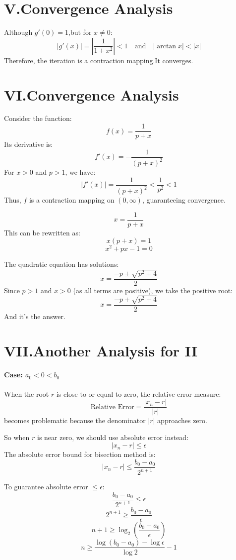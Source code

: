 \documentclass[a4paper]{article}
\begin{document}
\section*{V.Convergence Analysis}

Although $g'(0) = 1$,but for $x \neq 0$:
\[
|g'(x)| = \left|\frac{1}{1 + x^2}\right| < 1 \quad \text{and} \quad |\arctan x| < |x|
\]
Therefore, the iteration is a contraction mapping.It converges.

\section*{VI.Convergence Analysis}

Consider the function:
\[
f(x) = \frac{1}{p + x}
\]
Its derivative is:
\[
f'(x) = -\frac{1}{(p + x)^2}
\]
For \( x > 0 \) and \( p > 1 \), we have:
\[
|f'(x)| = \frac{1}{(p + x)^2} < \frac{1}{p^2} < 1
\]
Thus, \( f \) is a contraction mapping on \( (0, \infty) \), guaranteeing convergence.

\[
x = \frac{1}{p + x}
\]
This can be rewritten as:
\[
x(p + x) = 1
\]
\[
x^2 + px - 1 = 0
\]

The quadratic equation has solutions:
\[
x = \frac{-p \pm \sqrt{p^2 + 4}}{2}
\]
Since \( p > 1 \) and \( x > 0 \) (as all terms are positive), we take the positive root:
\[
x = \frac{-p + \sqrt{p^2 + 4}}{2}
\]
And it's the answer.

\section*{VII.Another Analysis for II}
\paragraph*{Case: $a_0 < 0 < b_0$}
When the root $r$ is close to or equal to zero, the relative error measure:
\[
\text{Relative Error} = \frac{|x_n - r|}{|r|}
\]
becomes problematic because the denominator $|r|$ approaches zero.

So when $r$ is near zero, we should use absolute error instead:
\[
|x_n - r| \leq \epsilon
\]
The absolute error bound for bisection method is:
\[
|x_n - r| \leq \frac{b_0 - a_0}{2^{n+1}}
\]

To guarantee absolute error $\leq \epsilon$:
\[
\frac{b_0 - a_0}{2^{n+1}} \leq \epsilon
\]
\[
2^{n+1} \geq \frac{b_0 - a_0}{\epsilon}
\]
\[
n + 1 \geq \log_2 \left( \frac{b_0 - a_0}{\epsilon} \right)
\]
\[
n \geq \frac{\log(b_0 - a_0) - \log \epsilon}{\log 2} - 1
\]
\end{document}
